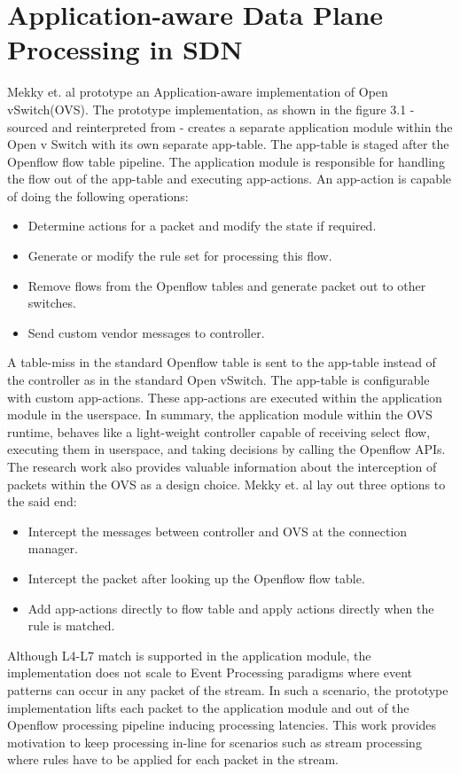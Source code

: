 \section{Application-aware Data Plane Processing in SDN}
Mekky et. al \cite{mekky2014application} prototype an Application-aware implementation of Open vSwitch(OVS). The prototype implementation, as shown in the figure 3.1 - sourced and reinterpreted from \cite{mekky2014application} -  creates a separate application module within the Open v Switch with  its own separate app-table. The app-table is staged after the Openflow flow table pipeline. The application module is responsible for handling the flow out of the app-table and executing app-actions. An app-action is capable of doing the following operations:
\begin{itemize}
\item Determine actions for a packet and modify the state if required.
\item Generate or modify the rule set for processing this flow.
\item Remove flows from the Openflow tables and generate packet out to other switches.
\item Send custom vendor messages to controller.
\end{itemize}
A table-miss in the standard Openflow table is sent to the app-table instead of the controller as in the standard Open vSwitch. The app-table is configurable with custom app-actions. These app-actions are executed within the application module in the userspace. In summary, the application module within the OVS runtime, behaves like a light-weight controller capable of receiving select flow, executing them in userspace, and taking decisions by calling the Openflow APIs. The research work also provides valuable information about the interception of packets within the OVS as a design choice. Mekky et. al lay out three options to the said end:
\begin{itemize}
	\item Intercept the messages between controller and OVS at the connection manager.
	\item Intercept the packet after looking up the Openflow flow table.
	\item Add app-actions directly to flow table and apply actions directly when the rule is matched.
\end{itemize}
 Although L4-L7 match is supported in the application module, the implementation does not scale to Event Processing paradigms where event patterns can occur in any packet of the stream. In such a scenario, the prototype implementation lifts each packet to the application module and out of the Openflow processing pipeline inducing processing latencies. This work provides motivation to keep processing in-line for scenarios such as stream processing where rules have to be applied for each packet in the stream.


